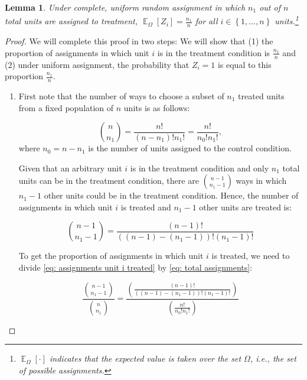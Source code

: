 \documentclass[12pt,leqno]{article}
\theoremstyle{newstyle}
\newtheorem{lem}{Lemma}
\DeclareMathOperator{\E}{\mathbb{E}}
\begin{document}
\begin{lem} \label{lem: exp val Z}
Under complete, uniform random assignment in which $n_1$ out of $n$ total units are assigned to treatment, $\E_{\Omega}\left[Z_i\right] = \frac{n_1}{n}$ for all $i \in \left\{1, \dots , n\right\}$ units.\footnote{$\E_{\Omega}\left[\cdot\right]$ indicates that the expected value is taken over the set $\Omega$, i.e., the set of possible assignments.}
\end{lem}
\begin{proof}

We will complete this proof in two steps: We will show that (1) the proportion of assignments in which unit $i$ is in the treatment condition is $\frac{n_1}{n}$ and (2) under uniform assignment, the probability that $Z_i = 1$ is equal to this proportion $\frac{n_1}{n}$.

\begin{enumerate}

\item First note that the number of ways to choose a subset of $n_1$ treated units from a fixed population of $n$ units is as follows:

\begin{equation} \label{eq: total assignments}
\binom{n}{n_1} = \frac{n!}{\left(n - n_1\right)!n_1!} = \frac{n!}{n_0!n_1!},
\end{equation}
where $n_0 = n - n_1$ is the number of units assigned to the control condition.

Given that an arbitrary unit $i$ is in the treatment condition and only $n_1$ total units can be in the treatment condition, there are $\binom{n - 1}{n_1 - 1}$ ways in which $n_1 - 1$ other units could be in the treatment condition. Hence, the number of assignments in which unit $i$ is treated and $n_1 - 1$ other units are treated is:

\begin{equation} \label{eq: assignments unit i treated}
\binom{n - 1}{n_1 - 1} = \frac{\left(n - 1\right)!}{\left(\left(n - 1\right) - \left(n_1 - 1\right)\right)!\left(n_1 - 1\right)!}
\end{equation}

To get the proportion of assignments in which unit $i$ is treated, we need to divide \eqref{eq: assignments unit i treated} by \eqref{eq: total assignments}:

\begin{equation} \label{eq: prop assignments unit i treated I}
\frac{\binom{n - 1}{n_1 - 1}}{\binom{n}{n_1}} = \frac{\left(\frac{\left(n - 1\right)!}{\left(\left(n - 1\right) - \left(n_1 - 1\right)\right)!\left(n_1 - 1\right)!}\right)}{\left(\frac{n!}{n_0!n_1!}\right)}
\end{equation}


\end{enumerate}
\end{proof}
\end{document}
